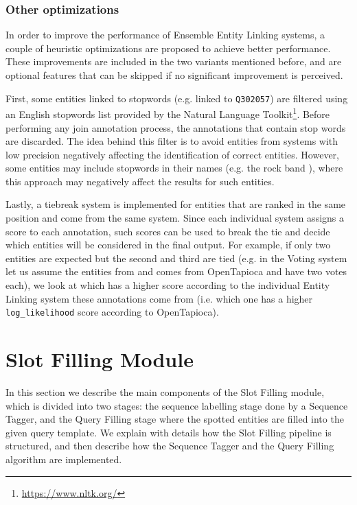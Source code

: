 \subsubsection{Other optimizations}
\label{cap3:system/entLinModule/ensembleSystems/optimizations}
In order to improve the performance of Ensemble Entity Linking systems, a couple of heuristic 
optimizations are proposed to achieve better performance. These improvements are included in 
the two variants mentioned before, and are optional features that can be skipped if no 
significant improvement is perceived. 

First, some entities linked to stopwords (e.g.  linked to \texttt{Q302057}) are 
filtered using an English stopwords list provided by the Natural Language Toolkit\footnote{\url{https://www.nltk.org/}}. 
Before performing any join annotation process, the annotations that contain stop words are 
discarded. The idea behind this filter is to avoid entities from systems with low precision 
negatively affecting the identification of correct entities. However, some entities may 
include stopwords in their names (e.g. the rock band ), where this approach 
may negatively affect the results for such entities.

Lastly, a tiebreak system is implemented for entities that are ranked in the same position 
and come from the same system. Since each individual system assigns a score to each annotation, 
such scores can be used to break the tie and decide which entities will be considered in the 
final output. For example, if only two entities are expected but the second and third are 
tied (e.g. in the Voting system let us assume the entities from  
and  comes from OpenTapioca and have two votes each), we look at which 
has a higher score according to the individual Entity Linking system these annotations come from 
(i.e. which one has a higher \texttt{log\_likelihood} score according to OpenTapioca). 

\section{Slot Filling Module}
\label{cap3:system/slotFillModule}
In this section we describe the main components of the Slot Filling module, which is divided 
into two stages: the sequence labelling stage done by a Sequence Tagger, and the Query 
Filling stage where the spotted entities are filled into the given query template. We explain 
with details how the Slot Filling pipeline is structured, and then describe how the Sequence 
Tagger and the Query Filling algorithm are implemented.

